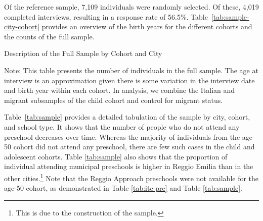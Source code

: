 Of the reference sample, 7,109 individuals were randomly selected. Of these, 4,019 completed interviews, resulting in a response rate of 56.5\%. Table~\ref{tab:sample-city-cohort} provides an overview of the birth years for the different cohorts and the counts of the full sample.
\begin{table}[H]
\centering
\begin{threeparttable}
	\caption{Description of the Full Sample by Cohort and City}\label{tab:sample-city-cohort}
	
\begin{tablenotes}
\footnotesize
Note: This table presents the number of individuals in the full sample. The age at interview is an approximation given there is some variation in the interview date and birth year within each cohort. In analysis, we combine the Italian and migrant subsamples of the child cohort and control for migrant status.
\end{tablenotes}
\end{threeparttable}
\end{table}

Table~\ref{tab:sample} provides a detailed tabulation of the sample by city, cohort, and school type. It shows that the number of people who do not attend any preschool decreases over time. Whereas the majority of individuals from the age-50 cohort did not attend any preschool, there are few such cases in the child and adolescent cohorts. Table \ref{tab:sample} also shows that the proportion of individual attending municipal preschools is higher in Reggio Emilia than in the other cities.\footnote{This is due to the construction of the sample.} Note that the Reggio Approach preschools were not available for the age-50 cohort, as demonstrated in Table \ref{tab:itc-pre} and Table \ref{tab:sample}. 

\begin{table}[H]
\centering
{}
\end{table}

